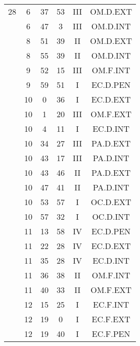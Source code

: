 \documentclass[12pt, a4paper]{article}
\begin{document}
\begin{multicols}{3}
{\begin{tabular}{c c c c c c}
	 	 	 	28 & 6 & 37 & 53 & III & OM.D.EXT\\%
	 	 	 	 & 6 & 47 & 3 & III & OM.D.INT\\%
	 	 	 	 & 8 & 51 & 39 & II & OM.D.EXT\\%
	 	 	 	 & 8 & 55 & 39 & II & OM.D.INT\\%
	 	 	 	 & 9 & 52 & 15 & III & OM.F.INT\\%
	 	 	 	 & 9 & 59 & 51 & I & EC.D.PEN\\%
	 	 	 	 & 10 & 0 & 36 & I & EC.D.EXT\\%
	 	 	 	 & 10 & 1 & 20 & III & OM.F.EXT\\%
	 	 	 	 & 10 & 4 & 11 & I & EC.D.INT\\%
	 	 	 	 & 10 & 34 & 27 & III & PA.D.EXT\\%
	 	 	 	 & 10 & 43 & 17 & III & PA.D.INT\\%
	 	 	 	 & 10 & 43 & 46 & II & PA.D.EXT\\%
	 	 	 	 & 10 & 47 & 41 & II & PA.D.INT\\%
	 	 	 	 & 10 & 53 & 57 & I & OC.D.EXT\\%
	 	 	 	 & 10 & 57 & 32 & I & OC.D.INT\\%
	 	 	 	 & 11 & 13 & 58 & IV & EC.D.PEN\\%
	 	 	 	 & 11 & 22 & 28 & IV & EC.D.EXT\\%
	 	 	 	 & 11 & 35 & 28 & IV & EC.D.INT\\%
	 	 	 	 & 11 & 36 & 38 & II & OM.F.INT\\%
	 	 	 	 & 11 & 40 & 33 & II & OM.F.EXT\\%
	 	 	 	 & 12 & 15 & 25 & I & EC.F.INT\\%
	 	 	 	 & 12 & 19 & 0 & I & EC.F.EXT\\%
	 	 	 	 & 12 & 19 & 40 & I & EC.F.PEN\\%

\end{tabular}}
\end{multicols}
\end{document}
